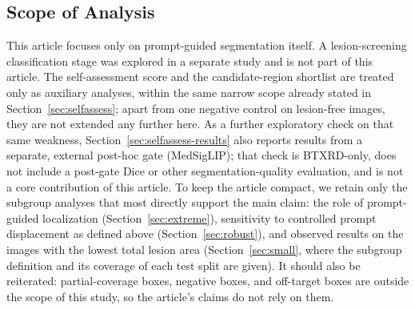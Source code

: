 \subsection{Scope of Analysis}
This article focuses only on prompt-guided segmentation itself. A lesion-screening classification stage was explored in a separate study and is not part of this article. The self-assessment score and the candidate-region shortlist are treated only as auxiliary analyses, within the same narrow scope already stated in Section~\ref{sec:selfassess}; apart from one negative control on lesion-free images, they are not extended any further here. As a further exploratory check on that same weakness, Section~\ref{sec:selfassess-results} also reports results from a separate, external post-hoc gate (MedSigLIP); that check is BTXRD-only, does not include a post-gate Dice or other segmentation-quality evaluation, and is not a core contribution of this article. To keep the article compact, we retain only the subgroup analyses that most directly support the main claim: the role of prompt-guided localization (Section~\ref{sec:extreme}), sensitivity to controlled prompt displacement as defined above (Section~\ref{sec:robust}), and observed results on the images with the lowest total lesion area (Section~\ref{sec:small}, where the subgroup definition and its coverage of each test split are given). It should also be reiterated: partial-coverage boxes, negative boxes, and off-target boxes are outside the scope of this study, so the article's claims do not rely on them.
